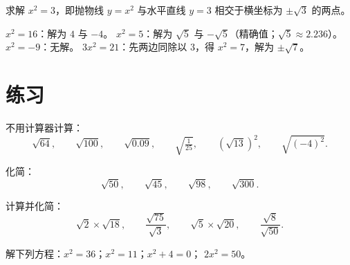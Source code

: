 \begin{omfigure}

{\small 求解 $x^2 = 3$，即抛物线 $y = x^2$ 与水平直线
$y = 3$ 相交于横坐标为 $\pm\sqrt3$ 的两点。}
\end{omfigure}

\begin{example}
$x^2 = 16$：解为 $4$ 与 $-4$。\quad
$x^2 = 5$：解为 $\sqrt5$ 与 $-\sqrt5$（精确值；$\sqrt5
\approx 2.236$）。\quad
$x^2 = -9$：无解。\quad
$3x^2 = 21$：先两边同除以 3，得 $x^2 = 7$，解为 $\pm\sqrt7$。
\end{example}

\section{练习}

\begin{exercise}[$\star$]\label{exo:g9:sqrt:1}
不用计算器计算：
\[
\sqrt{64}, \qquad \sqrt{100}, \qquad \sqrt{0.09}, \qquad
\sqrt{\tfrac{1}{25}}, \qquad \left(\sqrt{13}\right)^2, \qquad
\sqrt{(-4)^2} .
\]
\end{exercise}

\begin{exercise}[$\star$]\label{exo:g9:sqrt:2}
化简：
\[
\sqrt{50}, \qquad \sqrt{45}, \qquad \sqrt{98}, \qquad \sqrt{300} .
\]
\end{exercise}

\begin{exercise}[$\star$]\label{exo:g9:sqrt:3}
计算并化简：
\[
\sqrt2 \times \sqrt{18}, \qquad
\frac{\sqrt{75}}{\sqrt3}, \qquad
\sqrt5 \times \sqrt{20}, \qquad
\frac{\sqrt{8}}{\sqrt{50}} .
\]
\end{exercise}

\begin{exercise}[$\star$]\label{exo:g9:sqrt:4}
解下列方程：$x^2 = 36$；\quad $x^2 = 11$；\quad $x^2 + 4 = 0$；\quad
$2x^2 = 50$。
\end{exercise}

